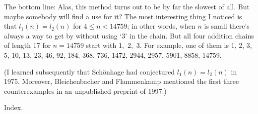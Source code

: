The bottom line: Alas, this method turns out to be by far
the
slowest of all. But maybe somebody will find a use for it?
The most interesting thing I noticed is that $l_1(n)=l_2(n)$
for $4\le n<14759$; in other words, when $n$ is small there's
always a way to get by without using `3' in the chain.
But all four addition chains of length 17 for $n=14759$
start with 1,~2,~3. For example, one of them is
1, 2, 3, 5, 10, 13, 23, 46, 92, 184, 368, 736, 1472, 2944, 2957, 5901, 8858,
14759.

(I learned subsequently that Sch\"onhage had conjectured $l_1(n)=l_2(n)$
in 1975. Moreover, Bleichenbacher and Flammenkamp mentioned
the first three counterexamples in an unpublished preprint of 1997.)

\fi

Index.
\fi

\inx
\fin
\con
